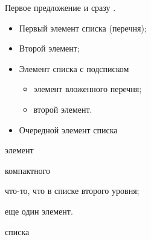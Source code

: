 \documentclass[14pt]{extarticle}
\begin{document}
\newlength{\lengthbox}
\setlength{\lengthbox}{4cm+12pt}
Первое предложение и сразу .
\begin{itemize}
\item Первый элемент списка (перечня);
\item Второй элемент;
	\item {Элемент списка с подсписком
	\begin{itemize}
	\item элемент вложенного перечня;
	\item второй элемент.
	\end{itemize}
	}
	\item Очередной элемент списка
\end{itemize}
\begin{compactitem}
\item элемент
\item компактного
	\begin{compactitem}
	\item что-то, что в списке второго уровня;
	\item еще один элемент.
	\end{compactitem}
\item списка
\end{compactitem}
\end{document}
